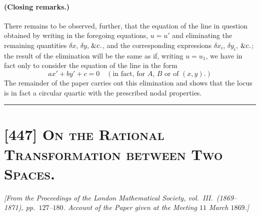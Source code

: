 \documentclass[11pt,a4paper]{article}
\begin{document}
\paragraph{(Closing remarks.)}
There remains to be observed, further, that the equation of the line in question
obtained by writing in the foregoing equations, $u = u'$ and eliminating the
remaining quantities $\delta x$, $\delta y$, $\&{\rm c}.$, and the corresponding
expressions $\delta x_i$, $\delta y_i$, $\&{\rm c}.$; the result of the elimination
will be the same as if, writing $u = u_1$, we have in fact only to consider the
equation of the line in the form
\[
ax' + by' + c = 0\quad(\text{in fact, for $A$, $B$ or of $(x, y)$.})
\]
The remainder of the paper carries out this elimination and shows that the locus
is in fact a circular quartic with the prescribed nodal properties.

\bigskip
\hrule
\bigskip

\section*{[447] \textsc{On the Rational Transformation between Two Spaces.}}

\begin{center}
\textit{[From the Proceedings of the London Mathematical Society, vol.\ III.\
(1869--1871), pp.\ $127$--$180$. Account of the Paper given at the Meeting
$11$ March $1869$.]}
\end{center}

\medskip
\end{document}
